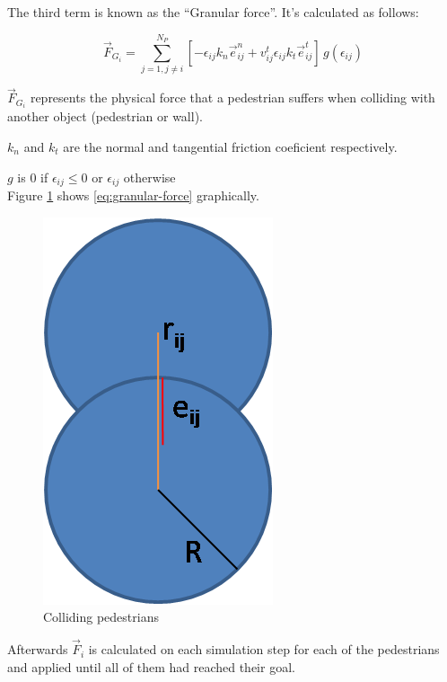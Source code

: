 \documentclass[english]{article}
\begin{document}
The third term is known as the ``Granular force''. It's calculated
as follows:

\begin{equation}
\vec{F}_{G_{i}}=\sum_{j=1,j\ne i}^{N_{P}}[-\epsilon_{ij}k_{n}\vec{e}_{ij}^{n}+v_{ij}^{t}\epsilon_{ij}k_{t}\vec{e}_{ij}^{t}]\, g(\epsilon_{ij})\label{eq:granular-force}
\end{equation}


$\vec{F}_{G_{i}}$ represents the physical force that a pedestrian
suffers when colliding with another object (pedestrian or wall).

$k_{n}$ and $k_{t}$ are the normal and tangential friction coeficient
respectively.

$g$ is $0$ if $\epsilon_{ij}\leq0$ or $\epsilon_{ij}$ otherwise\\


Figure \ref{fig:colliding-pedestrians} shows \ref{eq:granular-force}
graphically.

\begin{figure}[h]
\begin{centering}
\includegraphics[scale=0.4]{pics/sfm/ganular} 
\par\end{centering}

\caption{Colliding pedestrians\label{fig:colliding-pedestrians}}
\end{figure}


Afterwards $\vec{F}_{i}$ is calculated on each simulation step for
each of the pedestrians and applied until all of them had reached
their goal.
\end{document}

